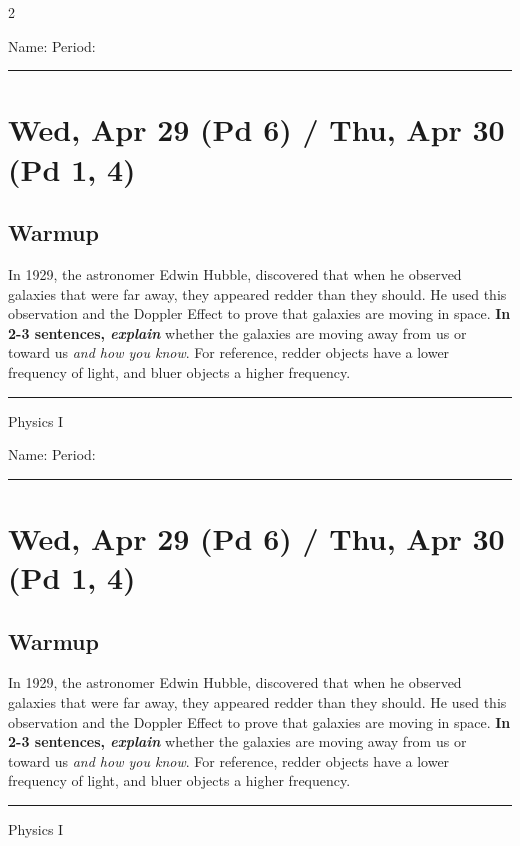 \documentclass[10pt,landscape]{exam}
\def\todayDate{Wed, Apr 29 (Pd 6) / Thu, Apr 30 (Pd 1, 4)}
\def\content{
In 1929, the astronomer Edwin Hubble, discovered that when he observed galaxies that were far away, they appeared redder than they should. He used this observation and the Doppler Effect to prove that galaxies are moving in space. \textbf{In 2-3 sentences, \emph{explain}} whether the galaxies are moving away from us or toward us \emph{and how you know}.  For reference, redder objects have a lower frequency of light, and bluer objects a higher frequency.}
\begin{document}
\pagestyle{empty}

\setlength{\columnsep}{0.8in}
\begin{multicols*}{2}

\noindent  
Name: \hfill Period: \hspace{5em}
\vspace{0.5em}
\hrule

\section*{\todayDate}
\subsection*{Warmup}

\content

\vfill
\hrule
\vspace{0.5em}
\hfill {\sc Physics I}

\columnbreak

\noindent  
Name: \hfill Period: \hspace{5em}
\vspace{0.5em}
\hrule

\section*{\todayDate}
\subsection*{Warmup}

\content

\vfill
\hrule
\vspace{0.5em}
\hfill {\sc Physics I}

\end{multicols*}
\end{document}
